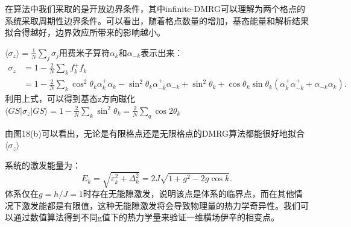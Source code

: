 \documentclass[12pt]{article}
\begin{document}
      在算法中我们采取的是开放边界条件，其中infinite-DMRG可以理解为两个格点的系统采取周期性边界条件。可以看出，随着格点数量的增加，基态能量和解析结果拟合得越好，边界效应所带来的影响越小。
      
      
       $\langle\sigma_z\rangle=\frac{1}{N}\sum_j\sigma_{j}$用费米子算符$\alpha_k$和$\alpha_{-k}$表示出来：
       \begin{equation} \begin{split} \sigma_z&=1-\frac{2}{N}\sum_kf_k^+f_k\\ &=1-\frac{2}{N}\sum_k \cos^2\theta_k\alpha_k^+\alpha_k- \sin^2\theta_k\alpha_{-k}^+\alpha_{-k}+\sin^2\theta_k+\cos\theta_k\sin\theta_k(\alpha_k^+\alpha_{-k}^++\alpha_{-k}\alpha_k). \end{split} \end{equation}
       利用上式，可以得到基态z方向磁化$\langle GS|\sigma_z|GS\rangle=1-\frac{2}{N}\sum_k \sin^2\theta_k=\frac{2}{N}\sum_q\cos2\theta_k$
       
       由图18(b)可以看出，无论是有限格点还是无限格点的DMRG算法都能很好地拟合$\langle\sigma_z\rangle$
       
      
      系统的激发能量为：
      \begin{equation}
      	E_k=\sqrt{\varepsilon_k^2+\Delta_k^2}=2J\sqrt{1+g^2-2g\cos k}.
      \end{equation}
      体系仅在$g=h/J=1$时存在无能隙激发，说明该点是体系的临界点，而在其他情况下激发能都是有限值，这种无能隙激发将会导致物理量的热力学奇异性。我们可以通过数值算法得到不同g值下的热力学量来验证一维横场伊辛的相变点\cite{hauschild2018efficient}。
      
\end{document}

